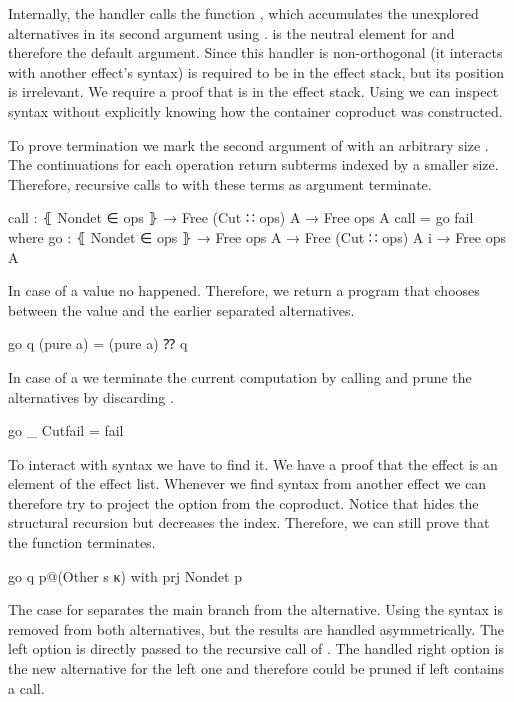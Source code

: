 \begin{AgdaAlign}
Internally, the handler calls the function , which accumulates
the unexplored alternatives in its second argument using .
 is the neutral element for  and therefore
the default argument.
Since this handler is non-orthogonal (it interacts with another effect's syntax)
 is required to be in the effect stack, but its position is
irrelevant.
We require a proof that  is in the effect stack.
Using  we can inspect  syntax without
explicitly knowing how the container coproduct was constructed.

To prove termination we mark the second argument of  with an
arbitrary size .
The continuations for each operation return subterms indexed by a smaller size.
Therefore, recursive calls to  with these terms as argument
terminate.

\begin{code}
call : ⦃ Nondet ∈ ops ⦄ → Free (Cut ∷ ops) A → Free ops A
call = go fail
  where
    go : ⦃ Nondet ∈ ops ⦄ → Free ops A → Free (Cut ∷ ops) A {i} → Free ops A
\end{code}
In case of a  value no 
happened.
Therefore, we return a program that chooses between the value and the earlier
separated alternatives.

\begin{code}
    go q (pure a)       = (pure a) ⁇ q
\end{code}
In case of a  we terminate the current computation by calling
 and prune the alternatives by discarding .

\begin{code}
    go _ Cutfail        = fail
\end{code}
To interact with  syntax we have to find it.
We have a proof that the  effect is an element of the effect
list.
Whenever we find syntax from another effect we can therefore try to project the
 option from the coproduct.
Notice that  hides the structural recursion but decreases the
 index.
Therefore, we can still prove that the function terminates.

\begin{code}
    go q p@(Other s κ)  with prj {Nondet} p
\end{code}
The case for  separates the main branch from the alternative.
Using  the  syntax is removed from both
alternatives, but the results are handled asymmetrically.
The left option is directly passed to the recursive call of
.
The handled right option is the new alternative for the left one and therefore
could be pruned if left contains a  call.


\end{AgdaAlign}
